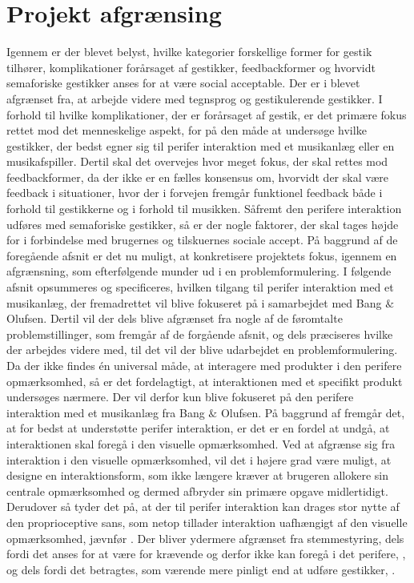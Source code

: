\chapter{Projekt afgrænsing}
\label{Afgraensning}
%
%
Igennem  er der blevet belyst, hvilke kategorier forskellige former for gestik tilhører, komplikationer forårsaget af gestikker, feedbackformer og hvorvidt semaforiske gestikker anses for at være social acceptable. Der er i  blevet afgrænset fra, at arbejde videre med tegnsprog og gestikulerende gestikker. I forhold til hvilke komplikationer, der er forårsaget af gestik, er det primære fokus rettet mod det menneskelige aspekt, for på den måde at undersøge hvilke gestikker, der bedst egner sig til perifer interaktion med et musikanlæg eller en musikafspiller. Dertil skal det overvejes hvor meget fokus, der skal rettes mod feedbackformer, da der ikke er en fælles konsensus om, hvorvidt der skal være feedback i situationer, hvor der i forvejen fremgår funktionel feedback både i forhold til gestikkerne og i forhold til musikken. Såfremt den perifere interaktion udføres med semaforiske gestikker, så er der nogle faktorer, der skal tages højde for i forbindelse med brugernes og tilskuernes sociale accept.\blankline
% 
På baggrund af de foregående afsnit er det nu muligt, at konkretisere projektets fokus, igennem en afgrænsning, som efterfølgende munder ud i en problemformulering.  
%
I følgende afsnit opsummeres og specificeres, hvilken tilgang til perifer interaktion med et musikanlæg, der fremadrettet vil blive fokuseret på i samarbejdet med Bang $\&$ Olufsen. Dertil vil der dels blive afgrænset fra nogle af de føromtalte problemstillinger, som fremgår af de forgående afsnit, og dels præciseres hvilke der arbejdes videre med, til det vil der blive udarbejdet en problemformulering.\blankline
% 
Da der ikke findes én universal måde, at interagere med produkter i den perifere opmærksomhed, så er det fordelagtigt, at interaktionen med et specifikt produkt undersøges nærmere. Der vil derfor kun blive fokuseret på den perifere interaktion med et musikanlæg fra Bang $\&$ Olufsen. På baggrund af  fremgår det, at for bedst at understøtte perifer interaktion, er det er en fordel at undgå, at interaktionen skal foregå i den visuelle opmærksomhed. Ved at afgrænse sig fra interaktion i den visuelle opmærksomhed, vil det i højere grad være muligt, at designe en interaktionsform, som ikke længere kræver at brugeren allokere sin centrale opmærksomhed og dermed afbryder sin primære opgave midlertidigt. Derudover så tyder det på, at der til perifer interaktion kan drages stor nytte af den proprioceptive sans, som netop tillader interaktion uafhængigt af den visuelle opmærksomhed, jævnfør . Der bliver ydermere afgrænset fra stemmestyring, dels fordi det anses for at være for krævende og derfor ikke kan foregå i det perifere, \parencite[s. 41]{PDF:PIEmbeddingHCIMicroManageMe}, og dels fordi det betragtes, som værende mere pinligt end at udføre gestikker, \parencite[s. 4]{PDF:AnExploratoryStudy}.        

